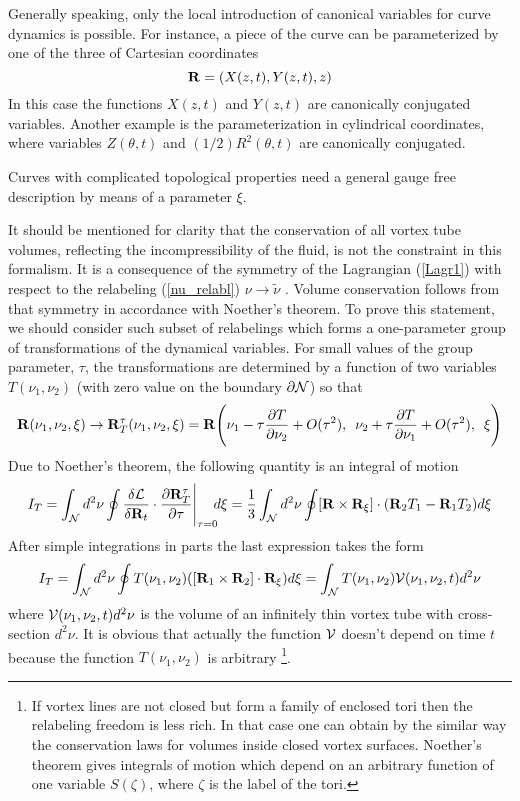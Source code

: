 Generally speaking, only the local introduction of canonical variables for curve 
dynamics is possible. For instance, a piece of the curve 
can be parameterized by one of the three of Cartesian coordinates
$$
{\bf R}=(X(z,t),Y(z,t),z)
$$
In this case the functions $X(z,t)$ and $Y(z,t)$ are canonically conjugated
variables. Another example is the parameterization in cylindrical coordinates,
where variables $Z(\theta,t)$ and $(1/2)R^2(\theta,t)$ are canonically conjugated.

Curves with complicated topological properties need a general
gauge free description by means of a parameter $\xi$.

It should be mentioned for clarity that the conservation of all 
vortex tube volumes, reflecting the incompressibility of the fluid, 
is not the constraint in this formalism. 
It is a consequence of the symmetry of the Lagrangian (\ref{Lagr1}) with
respect to the relabeling (\ref{nu_relabl})  $\nu\to\tilde\nu$ \cite{R99}. 
Volume conservation follows from that
symmetry in accordance with Noether's theorem.
To prove this statement, we should consider such subset of relabelings
which forms a one-parameter group of transformations of the dynamical variables. 
For small values of the group parameter, $\tau$, the transformations are 
determined by a function of two variables $T(\nu_1,\nu_2)$ 
(with zero value on the boundary $\partial {\cal N}$) so that
\begin{equation}\label{transf}
{\bf R}(\nu_1,\nu_2,\xi)\to{\bf R}^\tau_T(\nu_1,\nu_2,\xi)=
{\bf R}\Bigg(\nu_1-\tau\frac{\partial T}{\partial \nu_2}+O(\tau^2),\,\,\,
\nu_2+\tau\frac{\partial T}{\partial \nu_1}+O(\tau^2),\,\,\,\xi\Bigg)
\end{equation}
Due to Noether's theorem, the following quantity is an integral of motion
\cite{DNF}
$$
I_T=\int_{\cal N} d^2\nu\oint
\frac{\delta{\cal L}}{\delta {\bf R}_t}\cdot
\frac{\partial{\bf R}^\tau_T}{\partial\tau}\Bigg|_{\tau=0} \!\!d\xi
=\frac{1}{3} \int_{\cal N} d^2\nu 
\oint[{\bf R}\times{\bf R}_\xi]\cdot({\bf R}_2 T_1-{\bf R}_1 T_2)d\xi
$$
After simple integrations in parts the last expression takes the form
\begin{equation}
I_T= \int_{\cal N} d^2\nu \oint T(\nu_1,\nu_2)
([{\bf R}_1\times{\bf R}_2]\cdot{\bf R}_\xi)d\xi=
\int_{\cal N}  T(\nu_1,\nu_2){\cal V}(\nu_1,\nu_2,t)d^2\nu
\end{equation}
where ${\cal V}(\nu_1,\nu_2,t)d^2\nu$ is the volume of an infinitely thin vortex 
tube with cross-section $d^2\nu$. It is obvious that actually the function
${\cal V}$ doesn't depend on time $t$ because the function $T(\nu_1,\nu_2)$ 
is arbitrary
\footnote{
If vortex lines are not closed but form a family of enclosed tori 
then the relabeling freedom is less rich. 
In that case one can obtain by the similar way the conservation laws 
for volumes inside closed vortex surfaces. Noether's theorem gives 
integrals of motion which depend on an arbitrary function of one variable 
$S(\zeta)$, where $\zeta$ is the label of the tori.
}.



